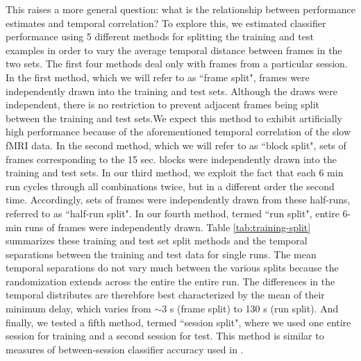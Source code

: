 \documentclass{article}
\begin{document}
This raises a more general question: what is the relationship between performance estimates and temporal correlation?
To explore this, we estimated classifier performance using 5 different methods for splitting the training and test examples in order to vary the average temporal distance between frames in the two sets. 
The first four methods deal only with frames from a particular session.
In the first method, which we will refer to as  ``frame split", frames were independently drawn into the training and test sets. 
Although the draws were independent, there is no restriction to prevent adjacent frames being split between the training and test sets.We expect this method to exhibit artificially high performance because of the aforementioned temporal correlation of the slow fMRI data.
In the second method, which we will refer to as ``block split", sets of frames corresponding to the 15 sec. blocks were independently drawn into the training and test sets.
In our third method, we exploit the fact that each 6 min run cycles through all combinations twice, but in a different order the second time.
Accordingly, sets of frames were independently drawn from these half-runs, referred to as ``half-run split". 
In our fourth method, termed ``run split", entire 6-min runs of frames were independently drawn. 
Table \ref{tab:training-split} summarizes these training and test set split methods and the temporal separations between the training and test data for single runs.
The mean temporal separations do not vary much between the various splits because the randomization extends across the entire the entire run. 
The differences in the temporal distributes are therebfore best characterized by the mean of their minimum delay, which varies from $\sim$3 s (frame split) to 130 s (run split).
And finally, we tested a fifth method, termed ``session split", where we used one entire session for training and a second session for test.
This method is similar to measures of between-session classifier accuracy used in \citep{Haynes2005}.

\end{document}
